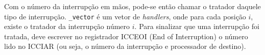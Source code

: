 \documentclass{ufscThesis/ufscThesis} %
\begin{document}
Com o número da interrupção em mãos, pode-se então chamar o tratador daquele tipo de interrupção. \verb+_vector+ é um vetor de \emph{handlers}, onde para cada posição $i$, existe o tratador da interrupção número $i$. Para sinalizar que uma interrupção foi tratada, deve escrever no registrador ICCEOI (End of Interruption) o número lido no ICCIAR (ou seja, o número da interrupção e processador de destino).






\end{document}
